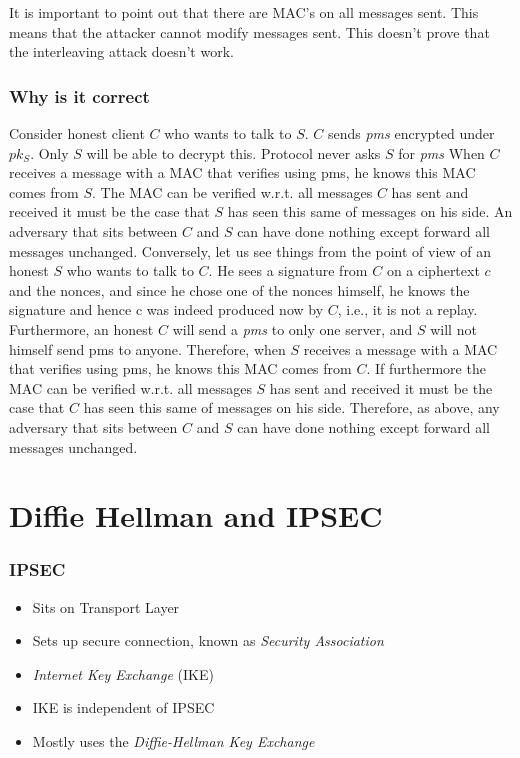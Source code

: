            \begin{frame}
                It is important to point out that there are MAC's on all messages sent. This means that the attacker cannot modify messages sent. This doesn't prove that the interleaving attack doesn't work. 
            \end{frame}

            \begin{frame}
                \frametitle{Why is it correct}
                    Consider honest client $C$ who wants to talk to $S$. $C$ sends \textit{pms} encrypted under $pk_S$.
                    Only $S$ will be able to decrypt this. 
                    Protocol never asks $S$ for \textit{pms} 
                    When $C$ receives a message with a MAC that verifies using pms, he knows this MAC comes from $S$. 
                    The MAC can be verified w.r.t. all messages $C$ has sent and received it must be the case that $S$ has seen this same of messages on his side. 
                    An adversary that sits between $C$ and $S$ can have done nothing except forward all messages unchanged. 
                    Conversely, let us see things from the point of view of an honest $S$ who wants to talk to $C$. He sees a signature from $C$ on a ciphertext $c$ and the nonces, and since he chose one of the nonces himself, he knows the signature and hence c was indeed produced now by $C$, i.e., it is not a replay. Furthermore, an honest $C$ will send a \textit{pms} to only one server, and $S$ will not himself send pms to anyone. Therefore, when $S$ receives a message with a MAC that verifies using pms, he knows this MAC comes from $C$. If furthermore the MAC can be verified w.r.t. all messages $S$ has sent and received it must be the case that $C$ has seen this same of messages on his side. Therefore, as above, any adversary that sits between $C$ and $S$ can have done nothing except forward all messages unchanged.
            \end{frame}

\section{Diffie Hellman and IPSEC}
    \begin{frame}
        \frametitle{IPSEC}
            \begin{itemize}
                \item Sits on Transport Layer
                \item Sets up secure connection, known as \textit{Security Association}
                \item \textit{Internet Key Exchange} (IKE)
                \item IKE is independent of IPSEC
                \item Mostly uses the \textit{Diffie-Hellman Key Exchange}
            \end{itemize}
    \end{frame}

